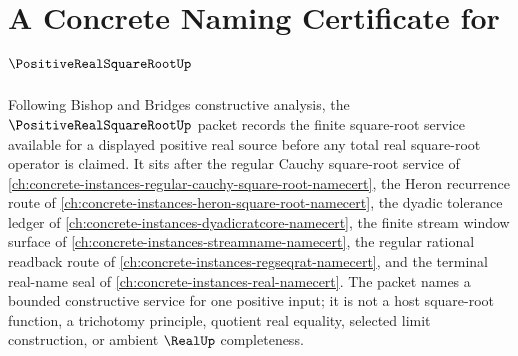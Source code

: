 \chapter{A Concrete Naming Certificate for $\PositiveRealSquareRootUp$}
\label{ch:concrete-instances-positive-real-square-root-namecert}

Following Bishop and Bridges constructive analysis, the $\PositiveRealSquareRootUp$ packet records the finite square-root service available for a displayed positive real source before any total real square-root operator is claimed. It sits after the regular Cauchy square-root service of \autoref{ch:concrete-instances-regular-cauchy-square-root-namecert}, the Heron recurrence route of \autoref{ch:concrete-instances-heron-square-root-namecert}, the dyadic tolerance ledger of \autoref{ch:concrete-instances-dyadicratcore-namecert}, the finite stream window surface of \autoref{ch:concrete-instances-streamname-namecert}, the regular rational readback route of \autoref{ch:concrete-instances-regseqrat-namecert}, and the terminal real-name seal of \autoref{ch:concrete-instances-real-namecert}. The packet names a bounded constructive service for one positive input; it is not a host square-root function, a trichotomy principle, quotient real equality, selected limit construction, or ambient $\RealUp$ completeness.

